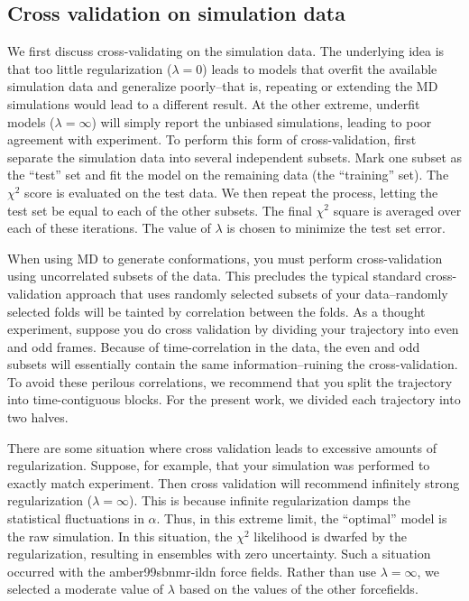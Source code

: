 \documentclass[journal=jacsat,manuscript=article]{achemso}
\begin{document}
\subsection{Cross validation on simulation data}

We first discuss cross-validating on the simulation data.  The underlying idea is that too little regularization ($\lambda = 0$) leads to models that overfit the available simulation data and generalize poorly--that is, repeating or extending the MD simulations would lead to a different result.  At the other extreme, underfit models ($\lambda = \infty$) will simply report the unbiased simulations, leading to poor agreement with experiment.  To perform this form of cross-validation, first separate the simulation data into several independent subsets.  Mark one subset as the ``test'' set and fit the model on the remaining data (the ``training'' set).  The $\chi^2$ score is evaluated on the test data.  We then repeat the process, letting the test set be equal to each of the other subsets.  The final $\chi^2$ square is averaged over each of these iterations.  The value of $\lambda$ is chosen to minimize the test set error.

When using MD to generate conformations, you must perform cross-validation using uncorrelated subsets of the data.  This precludes the typical standard cross-validation approach that uses randomly selected subsets of your data--randomly selected folds will be tainted by correlation between the folds.  As a thought experiment, suppose you do cross validation by dividing your trajectory into even and odd frames.  Because of time-correlation in the data, the even and odd subsets will essentially contain the same information--ruining the cross-validation.  To avoid these perilous correlations, we recommend that you split the trajectory into time-contiguous blocks.  For the present work, we divided each trajectory into two halves.  

There are some situation where cross validation leads to excessive amounts of regularization.  Suppose, for example, that your simulation was performed to exactly match experiment.  Then cross validation will recommend infinitely strong regularization ($\lambda = \infty$).  This is because infinite regularization damps the statistical fluctuations in $\alpha$.  Thus, in this extreme limit, the ``optimal'' model is the raw simulation.  In this situation, the $\chi^2$ likelihood is dwarfed by the regularization, resulting in ensembles with zero uncertainty.  Such a situation occurred with the amber99sbnmr-ildn force fields.  Rather than use $\lambda = \infty$, we selected a moderate value of $\lambda$ based on the values of the other forcefields.  
\end{document}
